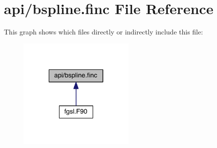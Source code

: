 \hypertarget{bspline_8finc}{\section{api/bspline.finc File Reference}
\label{bspline_8finc}
}
This graph shows which files directly or indirectly include this file\-:
\nopagebreak
\begin{figure}[H]
\begin{center}
\leavevmode
\includegraphics[width=162pt]{bspline_8finc__dep__incl}
\end{center}
\end{figure}
